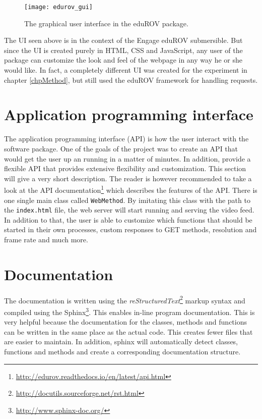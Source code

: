 \begin{figure}[h!]
    \centering
    \texttt{[image: edurov\_gui]}
    \caption{The graphical user interface in the eduROV package.}
    \label{edurov_gui}
\end{figure}

The UI seen above is in the context of the Engage eduROV submersible. But since the UI is created purely in HTML, CSS and JavaScript, any user of the package can customize the look and feel of the webpage in any way he or she would like. In fact, a completely different UI was created for the experiment in chapter \ref{chpMethod}, but still used the eduROV framework for handling requests.

\section{Application programming interface}

The application programming interface (API) is how the user interact with the software package. One of the goals of the project was to create an API that would get the user up an running in a matter of minutes. In addition, provide a flexible API that provides extensive flexibility and customization. This section will give a very short description. The reader is however recommended to take a look at the API documentation\footnote{\url{http://edurov.readthedocs.io/en/latest/api.html}} which describes the features of the API. There is one single main class called \texttt{WebMethod}. By imitating this class with the path to the \texttt{index.html} file, the web server will start running and serving the video feed. In addition to that, the user is able to customize which functions that should be started in their own processes, custom responses to GET methods, resolution and frame rate and much more.

\section{Documentation}


The documentation is written using the \emph{reStructuredText}\footnote{\url{http://docutils.sourceforge.net/rst.html}} markup syntax and compiled using the Sphinx\footnote{\url{http://www.sphinx-doc.org/}}. This enables in-line program documentation. This is very helpful because the documentation for the classes, methods and functions can be written in the same place as the actual code. This creates fewer files that are easier to maintain. In addition, sphinx will automatically detect classes, functions and methods and create a corresponding documentation structure.

